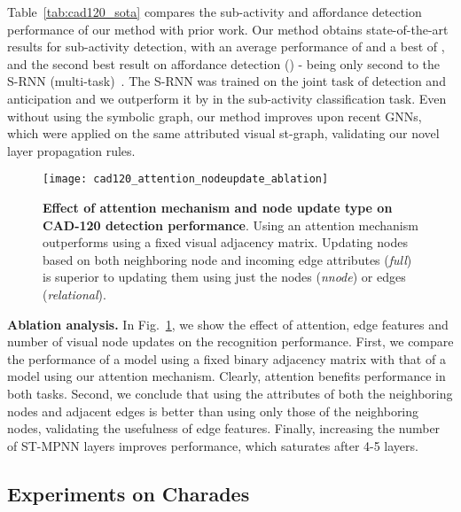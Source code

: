 \documentclass[runningheads]{llncs}
\begin{document}
Table~\ref{tab:cad120_sota} compares the sub-activity and affordance detection performance of our method with prior work. Our method obtains state-of-the-art results for sub-activity detection, with an average performance of  and a best of , and the second best result on affordance detection () - being only second to the S-RNN (multi-task)~\cite{Jain:CVPR16}. The S-RNN was trained on the joint task of detection and anticipation and we outperform it by  in the sub-activity classification task. Even without using the symbolic graph, our method improves upon recent GNNs, which were applied on the same attributed visual st-graph, validating our novel layer propagation rules.
\begin{figure}[t]
   \centering\texttt{[image: cad120\_attention\_nodeupdate\_ablation]}
   \caption{\textbf{Effect of attention mechanism and node update type on CAD-120 detection performance}. Using an attention mechanism  outperforms using a fixed visual adjacency matrix. Updating nodes based on both neighboring node and incoming edge attributes (\emph{full}) is superior to updating them using just the nodes (\emph{nnode}) or edges (\emph{relational}).}
\label{fig:cad120_attention_ablation}
\end{figure}
\textbf{Ablation analysis.} In Fig.~\ref{fig:cad120_attention_ablation}, we show the effect of attention, edge features and number of visual node updates on the recognition performance. First, we compare the performance of a model using a fixed binary adjacency matrix with that of a model using our attention mechanism. Clearly, attention benefits performance in both tasks. Second, we conclude that using the attributes of both the neighboring nodes and adjacent edges is better than using only those of the neighboring nodes, validating the usefulness of edge features. Finally, increasing the number of ST-MPNN layers improves performance, which saturates after 4-5 layers. 


\subsection{Experiments on Charades}
\label{subsec:charades}
\end{document}
